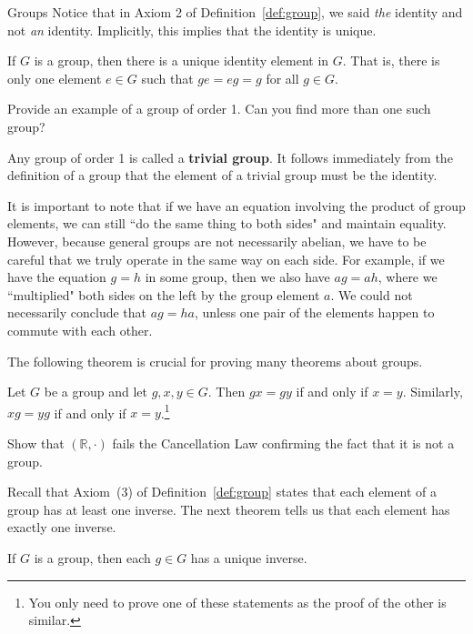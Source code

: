 \begin{section}{Groups}
Notice that in Axiom 2 of Definition~\ref{def:group}, we said \emph{the} identity and not \emph{an} identity.  Implicitly, this implies that the identity is unique.

\begin{theorem}\label{thm:unique_id}
If $G$ is a group, then there is a unique identity element in $G$.  That is, there is only one element $e\in G$ such that $ge=eg=g$ for all $g\in G$.
\end{theorem}

\begin{problem}
Provide an example of a group of order 1.  Can you find more than one such group?
\end{problem}

Any group of order 1 is called a \textbf{trivial group}. It follows immediately from the definition of a group that the element of a trivial group must be the identity.

It is important to note that if we have an equation involving the product of group elements, we can still ``do the same thing to both sides" and maintain equality. However, because general groups are not necessarily abelian, we have to be careful that we truly operate in the same way on each side. For example, if we have the equation $g = h$ in some group, then we also have $ag = ah$, where we ``multiplied" both sides on the left by the group element $a$. We could not necessarily conclude that $ag = ha$, unless one pair of the elements happen to commute with each other.

The following theorem is crucial for proving many theorems about groups.

\begin{theorem}
Let $G$ be a group and let $g,x,y\in G$.  Then $gx=gy$ if and only if $x=y$.  Similarly, $xg=yg$ if and only if $x=y$.\footnote{You only need to prove one of these statements as the proof of the other is similar.}
\end{theorem}

\begin{problem}
Show that $(\mathbb{R},\cdot)$ fails the Cancellation Law confirming the fact that it is not a group.
\end{problem}

Recall that Axiom~(3) of Definition~\ref{def:group} states that each element of a group has at least one inverse.  The next theorem tells us that each element has exactly one inverse.

\begin{theorem}\label{thm:unique_inverse}
If $G$ is a group, then each $g\in G$ has a unique inverse.
\end{theorem}


\end{section}
